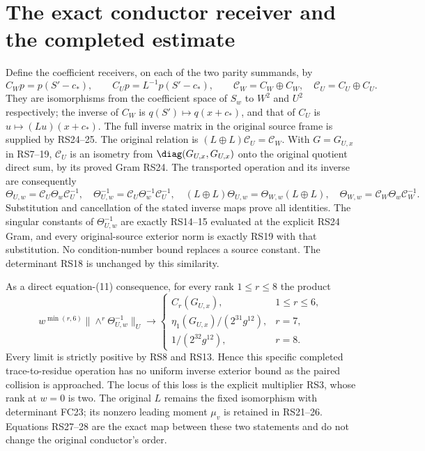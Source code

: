 \section{The exact conductor receiver and the completed estimate}
Define the coefficient receivers, on each of the two parity
summands, by
\begin{equation}
 C_Wp=p(S'-c_*),\qquad C_Up=L^{-1}p(S'-c_*),\qquad
 \mathcal C_W=C_W\oplus C_W,\quad
 \mathcal C_U=C_U\oplus C_U.
 \tag{RS27}
\end{equation}
They are isomorphisms from the coefficient space of $S_w$
to $W^2$ and $U^2$ respectively; the inverse of $C_W$ is
$q(S')\mapsto q(x+c_*)$, and that of $C_U$ is
$u\mapsto (Lu)(x+c_*)$. The full inverse matrix in the original
source frame is supplied by RS24--25. The original relation is
$(L\oplus L)\mathcal C_U=\mathcal C_W$.
With $G=G_{U,x}$ in RS7--19, $\mathcal C_U$ is an isometry
from $\diag(G_{U,x},G_{U,x})$ onto the original quotient direct sum,
by its proved Gram RS24. The transported operation and its
inverse are consequently
\begin{equation}
 \Theta_{U,w}=\mathcal C_U\Theta_w\mathcal C_U^{-1},\quad
 \Theta_{U,w}^{-1}=\mathcal C_U\Theta_w^{-1}\mathcal C_U^{-1},\quad
 (L\oplus L)\Theta_{U,w}=\Theta_{W,w}(L\oplus L),
 \quad\Theta_{W,w}=\mathcal C_W\Theta_w\mathcal C_W^{-1}.
 \tag{RS28}
\end{equation}
Substitution and cancellation of the stated inverse maps prove
all identities. The singular constants of $\Theta_{U,w}^{-1}$
are exactly RS14--15 evaluated at the explicit RS24 Gram,
and every original-source exterior norm is exactly RS19 with
that substitution. No condition-number bound replaces a source
constant. The determinant RS18 is unchanged by this similarity.

As a direct equation-(11) consequence, for every rank $1\le r\le8$
the product
\begin{equation}
 w^{\min(r,6)}\|\wedge^r\Theta_{U,w}^{-1}\|_U
 \longrightarrow
 \begin{cases}
 C_r(G_{U,x}),&1\le r\le6,\\
 \eta_1(G_{U,x})/(2^{31}g^{12}),&r=7,\\
 1/(2^{32}g^{12}),&r=8.
 \end{cases}
 \tag{RS29}
\end{equation}
Every limit is strictly positive by RS8 and RS13. Hence this
specific completed trace-to-residue operation has no uniform
inverse exterior bound as the paired collision is approached.
The locus of this loss is the explicit multiplier RS3, whose
rank at $w=0$ is two. The original $L$ remains the fixed
isomorphism with determinant FC23; its nonzero leading moment
$\mu_v$ is retained in RS21--26. Equations RS27--28 are the exact
map between these two statements and do not change the original
conductor's order.

